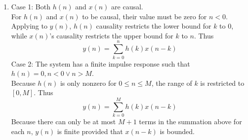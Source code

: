 \documentclass[12pt,a4paper]{article}
\begin{document}
\begin{enumerate}
    \item Case 1: Both $h(n)$ and $x(n)$ are causal.\\[0.5ex]
    For $h(n)$ and $x(n)$ to be causal, their value must be zero for $n<0$.
    Applying to $y(n)$, $h(n)$ causality restricts the lower bound for $k$ to $0$, while
    $x(n)$'s causality restricts the upper bound for $k$ to $n$. Thus
    \begin{equation*}
        y(n) = \sum_{k=0}^{n} h(k)x(n - k)
    \end{equation*}
    Case 2: The system has a finite impulse response such that $h(n) = 0, n < 0 \lor n > M$.\\[0.5ex]
    Because $h(n)$ is only nonzero for $0\leq n \leq M$, the range of $k$ is restricted to $[0,M]$. Thus
    \begin{equation*}
        y(n) = \sum_{k=0}^{M} h(k)x(n - k)
    \end{equation*}
    Because there can only be at most $M+1$ terms in the summation above for each $n$, $y(n)$
    is finite provided that $x(n-k)$ is bounded.


\end{enumerate}
\end{document}
